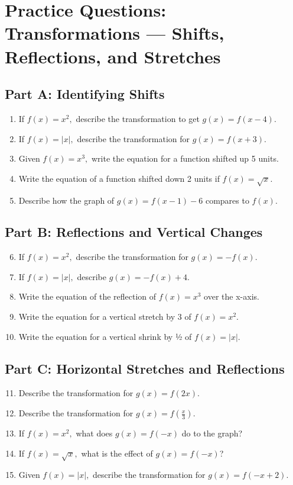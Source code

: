 \documentclass[14pt]{extarticle}
\begin{document}
\section*{Practice Questions: Transformations — Shifts, Reflections, and Stretches}

\subsection*{Part A: Identifying Shifts}
\begin{enumerate}
  \item If \(f(x) = x^2,\) describe the transformation to get \(g(x) = f(x - 4).\)
  \item If \(f(x) = |x|,\) describe the transformation for \(g(x) = f(x + 3).\)
  \item Given \(f(x) = x^3,\) write the equation for a function shifted up 5 units.
  \item Write the equation of a function shifted down 2 units if \(f(x) = \sqrt{x}.\)
  \item Describe how the graph of \(g(x) = f(x - 1) - 6\) compares to \(f(x).\)
\end{enumerate}

\subsection*{Part B: Reflections and Vertical Changes}
\begin{enumerate}
  \setcounter{enumi}{5}
  \item If \(f(x) = x^2,\) describe the transformation for \(g(x) = -f(x).\)
  \item If \(f(x) = |x|,\) describe \(g(x) = -f(x) + 4.\)
  \item Write the equation of the reflection of \(f(x) = x^3\) over the x-axis.
  \item Write the equation for a vertical stretch by 3 of \(f(x) = x^2.\)
  \item Write the equation for a vertical shrink by ½ of \(f(x) = |x|.\)
\end{enumerate}

\subsection*{Part C: Horizontal Stretches and Reflections}
\begin{enumerate}
  \setcounter{enumi}{10}
  \item Describe the transformation for \(g(x) = f(2x)\).
  \item Describe the transformation for \(g(x) = f\left(\frac{x}{3}\right)\).
  \item If \(f(x) = x^2,\) what does \(g(x) = f(-x)\) do to the graph?
  \item If \(f(x) = \sqrt{x},\) what is the effect of \(g(x) = f(-x)\)?
  \item Given \(f(x) = |x|,\) describe the transformation for \(g(x) = f(-x + 2)\).
\end{enumerate}
\end{document}
